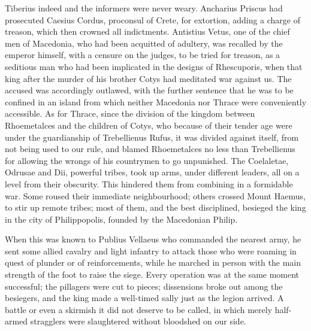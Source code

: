 Tiberius indeed and the informers were never weary. Ancharius Priscus had prosecuted Caesius Cordus, proconsul of Crete, for extortion, adding a charge of treason, which then crowned all indictments. Antistius Vetus, one of the chief men of Macedonia, who had been acquitted of adultery, was recalled by the emperor himself, with a censure on the judges, to be tried for treason, as a seditious man who had been implicated in the designs of Rhescuporis, when that king after the murder of his brother Cotys had meditated war against us. The accused was accordingly outlawed, with the further sentence that he was to be confined in an island from which neither Macedonia nor Thrace were conveniently accessible. As for Thrace, since the division of the kingdom between Rhoemetalces and the children of Cotys, who because of their tender age were under the guardianship of Trebellienus Rufus, it was divided against itself, from not being used to our rule, and blamed Rhoemetalces no less than Trebellienus for allowing the wrongs of his countrymen to go unpunished. The Coelaletae, Odrusae and Dii, powerful tribes, took up arms, under different leaders, all on a level from their obscurity. This hindered them from combining in a formidable war. Some roused their immediate neighbourhood; others crossed Mount Haemus, to stir up remote tribes; most of them, and the best disciplined, besieged the king in the city of Philippopolis, founded by the Macedonian Philip.


When this was known to Publius Vellaeus who commanded the nearest army, he sent some allied cavalry and light infantry to attack those who were roaming in quest of plunder or of reinforcements, while he marched in person with the main strength of the foot to raise the siege. Every operation was at the same moment successful; the pillagers were cut to pieces; dissensions broke out among the besiegers, and the king made a well-timed sally just as the legion arrived. A battle or even a skirmish it did not deserve to be called, in which merely half-armed stragglers were slaughtered without bloodshed on our side.



